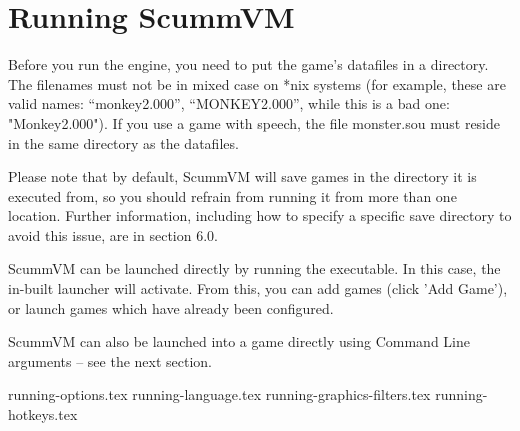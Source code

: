 


\section{Running ScummVM}

Before you run the engine, you need to put the game's datafiles in a
directory. The filenames must not be in mixed case on *nix systems
(for example, these are valid names: ``monkey2.000'', ``MONKEY2.000'', while
this is a bad one: "Monkey2.000"). If you use a game with speech, the file
monster.sou must reside in the same directory as the datafiles.

Please note that by default, ScummVM will save games in the directory
it is executed from, so you should refrain from running it from more than
one location. Further information, including how to specify a specific save
directory to avoid this issue, are in section 6.0.

ScummVM can be launched directly by running the executable. In this case,
the in-built launcher will activate. From this, you can add games (click
'Add Game'), or launch games which have already been configured.

ScummVM can also be launched into a game directly using Command Line
arguments -- see the next section.

 {running-options.tex}
 {running-language.tex}
 {running-graphics-filters.tex}
 {running-hotkeys.tex}
